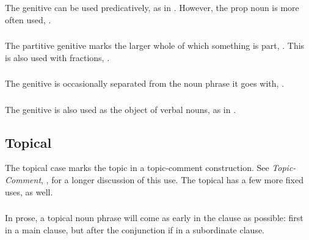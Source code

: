 \subsubsection{} The genitive can be used predicatively, as in
 .  However, the prop noun
  is more often used,
 . \label{syn:pum:genitive}

\subsubsection{} The partitive genitive marks the larger whole of
which something is part,  .  This is also used with fractions,  . 
\label{syn:partitive-gen}

\subsubsection{} The genitive is occasionally separated from the noun
phrase it goes with,  .

\subsubsection{} The genitive is also used as the object of verbal
nouns, as in  .

\subsection{Topical} The topical case marks the topic in a
topic-comment construction.  See \textit{Topic-Comment},
, for a longer discussion of this use.
The topical has a few more fixed uses, as well.

\subsubsection{} In prose, a topical noun phrase will come as early in
the clause as possible: first in a main clause, but after the
conjunction if in a subordinate clause. 
\label{syn!topical!word-order}

